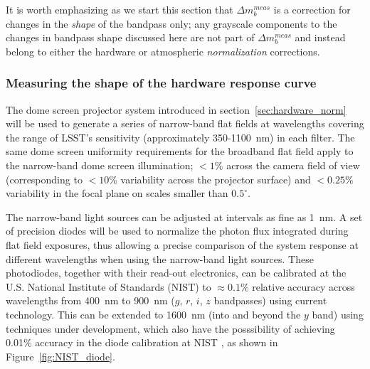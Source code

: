\documentclass[12pt,preprint]{aastex}
\begin{document}
It is worth emphasizing as we start this section that $\Delta
m_b^{meas}$ is a correction for changes in the {\it shape} of the
bandpass only; any grayscale components to the changes in bandpass
shape discussed here are not part of $\Delta m_b^{meas}$ and instead
belong to either the hardware or atmospheric {\it normalization}
corrections.

\subsubsection{Measuring the shape of the hardware response curve}
\label{sec:hardware_phi}

The dome screen projector system introduced in
section~\ref{sec:hardware_norm} will be used to generate a series of
narrow-band flat fields at wavelengths covering the range of LSST's
sensitivity (approximately 350-1100~nm) in each filter.  The same dome
screen uniformity requirements for the broadband flat field apply to
the narrow-band dome screen illumination; $<1\%$ across the camera
field of view (corresponding to $<10\%$ variability across the
projector surface) and $<0.25\%$ variability in the focal plane on
scales smaller than $0.5^{\circ}$.

The narrow-band light sources can be adjusted at intervals as fine as
1~nm.  A set of precision diodes will be used to normalize the photon
flux integrated during flat field exposures, thus allowing a precise
comparison of the system response at different wavelengths when using
the narrow-band light sources.  These photodiodes, together with their
read-out electronics, can be calibrated at the U.S. National Institute
of Standards (NIST) to $\approx0.1\%$ relative accuracy across
wavelengths from 400~nm to 900~nm ($g$, $r$, $i$, $z$ bandpasses)
using current technology.  This can be extended to 1600~nm (into and
beyond the $y$ band) using techniques under development, which also
have the posssibility of achieving 0.01\% accuracy in the diode
calibration at NIST \citep{Eppeldauer09}, as shown in
Figure~\ref{fig:NIST_diode}.
\end{document}
